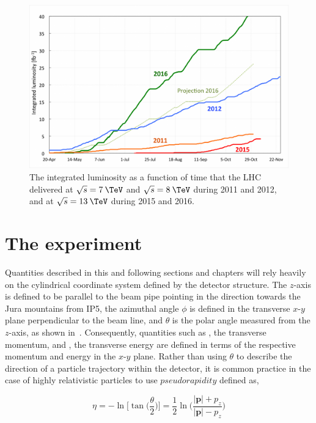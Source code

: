 \begin{figure}
  \centering
  \includegraphics[width=\textwidth]{figs/lumi-proj-2016-final-v2.png}
  \caption{The integrated luminosity as a function of time that the LHC delivered at $\sqrt{s}=7\:\TeV$ and $\sqrt{s}=8\:\TeV$ during 2011 and 2012, and at $\sqrt{s}=13\:\TeV$ during 2015 and 2016.}
  \label{fig:LHClumi}
\end{figure}

\section{The \CMS experiment}
\label{sec:CMSInDetail}

Quantities described in this and following sections and chapters will rely heavily on the cylindrical coordinate system defined by the detector structure. The $z$-axis is defined to be parallel to the beam pipe pointing in the direction towards the Jura mountains from IP5, the azimuthal angle $\phi$ is defined in the transverse $x$-$y$ plane perpendicular to the beam line, and $\theta$ is the polar angle measured from the $z$-axis, as shown in~. Consequently, quantities such as \pt, the transverse momentum, and \Et, the transverse energy are defined in terms of the respective momentum and energy in the $x$-$y$ plane. Rather than using $\theta$ to describe the direction of a particle trajectory within the detector, it is common practice in the case of highly relativistic particles to use $pseudorapidity$ defined as, 

\begin{equation}
  \eta = -\ln{\Big[\tan\big(\frac{\theta}{2}\big)\Big]} = \frac{1}{2}\ln{\Big(\frac{|\textbf{p}|+p_{z}}{|\textbf{p}|-p_{z}}\Big)} 
\end{equation}

